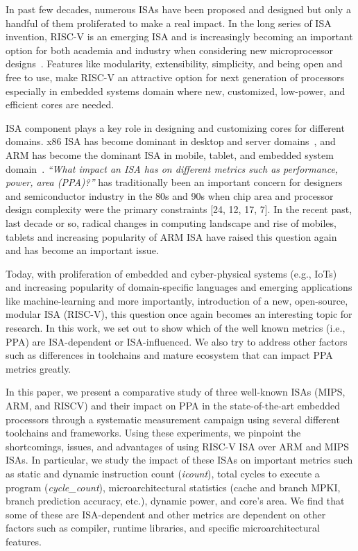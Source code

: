 \label{sec:intro}

In past few decades, numerous ISAs have been proposed and designed but only a handful of them proliferated to make a real impact. In the long series of ISA invention, RISC-V is an emerging ISA and is increasingly becoming an important option for both academia and industry when considering new microprocessor designs~\cite{risc-v}. Features like modularity, extensibility, simplicity, and being open and free to use, make RISC-V an attractive option for next generation of processors especially in embedded systems domain where new, customized, low-power, and efficient cores are needed.  

ISA component plays a key role in designing and customizing cores for different domains. x86 ISA has become dominant in desktop and server domains~\cite{x86-isa}, and ARM has become the dominant ISA in mobile, tablet, and embedded system domain~\cite{arm-isa}. \emph{``What impact an ISA has on different metrics such as performance, power, area (PPA)?''} has traditionally been an important concern for designers and semiconductor industry in the 80s and 90s when chip area and processor design complexity were the primary constraints [24, 12, 17, 7]. In the recent past, last decade or so, radical changes in computing landscape and rise of mobiles, tablets and increasing popularity of ARM ISA have raised this question again and has become an important issue. 

Today, with proliferation of embedded and cyber-physical systems (e.g., IoTs) and increasing popularity of domain-specific languages and emerging applications like machine-learning and more importantly, introduction of a new, open-source, modular ISA (RISC-V), this question once again becomes an interesting topic for research. In this work, we set out to show which of the well known metrics (i.e., PPA) are ISA-dependent or ISA-influenced. We also try to address other factors such as differences in toolchains and mature ecosystem that can impact PPA metrics greatly. 

In this paper, we present a comparative study of three well-known ISAs (MIPS, ARM, and RISCV) and their impact on PPA in the state-of-the-art embedded processors through a systematic measurement campaign using several different toolchains and frameworks. Using these experiments, we pinpoint the shortcomings, issues, and advantages of using RISC-V ISA over ARM and MIPS ISAs.  In particular, we study the impact of these ISAs on important metrics such as static and dynamic instruction count (\textit{icount}), total cycles to execute a program (\textit{cycle\_count}), microarchitectural statistics (cache and branch MPKI, branch prediction accuracy, etc.), dynamic power, and core's area. We find that some of these are ISA-dependent and other metrics are dependent on other factors such as compiler, runtime libraries, and specific microarchitectural features. 

